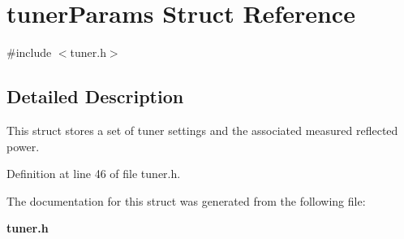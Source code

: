\section{tuner\-Params Struct Reference}
\label{structtuner_params}


{\ttfamily \#include $<$tuner.\-h$>$}



\subsection{Detailed Description}
This struct stores a set of tuner settings and the associated measured reflected power. 

Definition at line 46 of file tuner.\-h.



The documentation for this struct was generated from the following file\-:\begin{DoxyCompactItemize}
\item 
{\bf tuner.\-h}\end{DoxyCompactItemize}

